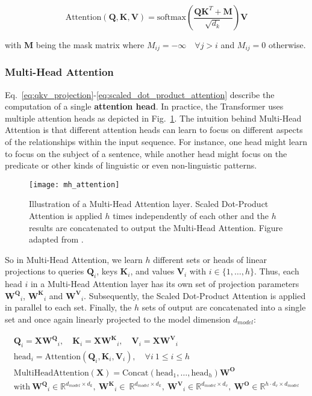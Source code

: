 \begin{equation}
    \label{eq:scaled_dot_product_attention}
    \text{Attention}(\bm{Q}, \bm{K}, \bm{V}) = 
    \text{softmax}\left(\frac{\bm{Q} \bm{K}^T + \bm{M}}{\sqrt{d_k}}\right) \bm{V}
\end{equation}

with $\bm{M}$ being the mask matrix where $M_{ij} = -\infty \quad \forall j > i$
and $M_{ij} = 0$ otherwise.

\subsubsection{Multi-Head Attention}
Eq.~\ref{eq:qkv_projection}-\ref{eq:scaled_dot_product_attention} describe the
computation of a single \textbf{attention head}. In practice, the Transformer
uses multiple attention heads as depicted in Fig.~\ref{fig:mh_attention}. The
intuition behind Multi-Head Attention is that different attention heads can
learn to focus on different aspects of the relationships within the input
sequence. For instance, one head might learn to focus on the subject of a
sentence, while another head might focus on the predicate or other kinds of
linguistic or even non-linguistic patterns.

\begin{figure}[htb]
    \centering
    \texttt{[image: mh\_attention]}
    \caption[Illustration of Multi-Head Attention]{Illustration of a Multi-Head
    Attention layer. Scaled Dot-Product Attention is applied $h$ times
    independently of each other and the $h$ results are concatenated to output
    the Multi-Head Attention. Figure adapted from \cite{vaswani2017attention}.}
    \label{fig:mh_attention}
\end{figure}

So in Multi-Head Attention, we learn $h$ different sets or heads of linear
projections to queries $\bm{Q}_i$, keys $\bm{K}_i$, and values $\bm{V}_i$ with
$i \in \{1, \ldots, h\}$. Thus, each head $i$ in a Multi-Head Attention layer
has its own set of projection parameters $\bm{W^Q}_i$, $\bm{W^K}_i$ and
$\bm{W^V}_i$. Subsequently, the Scaled Dot-Product Attention is applied in
parallel to each set. Finally, the $h$ sets of output are concatenated into a
single set and once again linearly projected to the model dimension $d_{model}$:

\begin{gather}
    \label{eq:mh_attention1}
    \bm{Q}_i = \bm{X} \bm{W^Q}_i, \quad 
    \bm{K}_i = \bm{X} \bm{W^K}_i, \quad 
    \bm{V}_i = \bm{X} \bm{W^V}_i \\
    \text{head}_i = \text{Attention}(\bm{Q}_i, \bm{K}_i, \bm{V}_i), \quad 
    \forall i \ 1 \leq i \leq h \\
    \label{eq:mh_attention2}
    \text{MultiHeadAttention}(\bm{X}) = \text{Concat}(\text{head}_1, \ldots, \text{head}_h) \bm{W^O} \\
    \text{with} \ \bm{W^Q}_i \in \mathbb{R}^{d_{model} \times d_k},\ 
    \bm{W^K}_i \in \ \mathbb{R}^{d_{model} \times d_k},\ 
    \bm{W^V}_i \in \mathbb{R}^{d_{model} \times d_v},\ 
    \bm{W^O}\in \mathbb{R}^{h \cdot d_v \times d_{model}} \nonumber
\end{gather}

